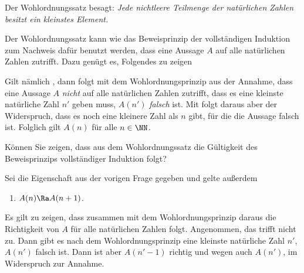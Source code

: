 \begin{antwort}
  Der Wohlordnungssatz besagt: \textit{Jede nichtleere Teilmenge 
    der natürlichen 
    Zahlen besitzt ein kleinstes Element.}

  Der Wohlordnungssatz kann wie das Beweisprinzip der vollständigen Induktion 
  zum Nachweis dafür benutzt werden, dass eine Aussage $A$ auf 
  alle natürlichen Zahlen zutrifft. Dazu genügt es, Folgendes 
  zu zeigen

  Gilt nämlich , dann folgt mit dem Wohlordnungsprinzip 
  aus der Annahme, dass eine Aussage $A$ \textit{nicht} auf 
  alle natürlichen Zahlen zutrifft, dass es eine 
  kleinste natürliche Zahl $n'$ 
  geben muss, {\sd} $A(n')$ \textit{falsch} ist. Mit 
   folgt daraus aber der Widerspruch, dass 
  es noch eine kleinere Zahl als $n$ gibt, für die die Aussage falsch ist. 
  Folglich gilt $A(n)$ für alle $n\in\NN$.
\end{antwort} 






\begin{frage}
  Können Sie zeigen, dass aus dem Wohlordnungssatz die Gültigkeit des 
  Beweisprinzips vollständiger Induktion folgt?
\end{frage}

\begin{antwort}
  Sei die Eigenschaft 
   aus der vorigen Frage gegeben und gelte außerdem 
  {\setlength{\labelsep}{5mm}
    \begin{enumerate}
    \item[\desc{ii'}] $A(n)\Ra A(n+1)$.   
    \end{enumerate}}
  Es gilt zu zeigen, dass zusammen 
  mit dem Wohlordnungsprinzip daraus die Richtigkeit von $A$ für alle 
  natürlichen Zahlen folgt. 
  Angenommen, das trifft nicht zu. Dann gibt es nach dem 
  Wohlordnungsprinzip eine 
  kleinste natürliche Zahl $n'$, 
  {\sd} $A(n')$ falsch ist. Dann ist aber $A(n'-1)$ 
  richtig und wegen  auch $A(n')$, im Widerspruch 
  zur Annahme. \AntEnd
\end{antwort} 






